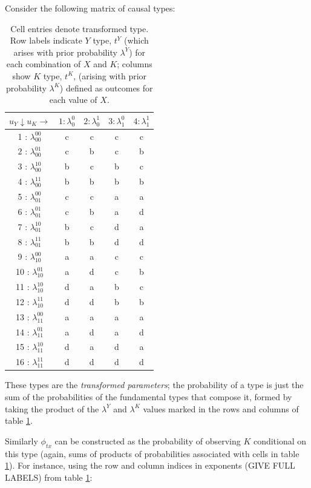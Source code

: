 \documentclass[12pt,]{book}
\begin{document}
Consider the following matrix of causal types:

\begin{table}[ht]
\centering
\begin{tabular}{ccccc}
  \hline
$u_Y \downarrow u_K \rightarrow$ & $1:  \lambda_0^0$ & $2: \lambda_0^1$ & $3: \lambda_1^0$ & $4: \lambda_1^1$ \\ 
  \hline
1 : $\lambda_{00}^{00}$ & c & c & c & c \\ 
  2 : $\lambda_{00}^{01}$ & c & b & c & b \\ 
  3 : $\lambda_{00}^{10}$ & b & c & b & c \\ 
  4 : $\lambda_{00}^{11}$ & b & b & b & b \\ 
  5 : $\lambda_{01}^{00}$ & c & c & a & a \\ 
  6 : $\lambda_{01}^{01}$ & c & b & a & d \\ 
  7 : $\lambda_{01}^{10}$ & b & c & d & a \\ 
  8 : $\lambda_{01}^{11}$ & b & b & d & d \\ 
  9 : $\lambda_{10}^{00}$ & a & a & c & c \\ 
  10 : $\lambda_{10}^{01}$ & a & d & c & b \\ 
  11 : $\lambda_{10}^{10}$ & d & a & b & c \\ 
  12 : $\lambda_{10}^{11}$ & d & d & b & b \\ 
  13 : $\lambda_{11}^{00}$ & a & a & a & a \\ 
  14 : $\lambda_{11}^{01}$ & a & d & a & d \\ 
  15 : $\lambda_{11}^{10}$ & d & a & d & a \\ 
  16 : $\lambda_{11}^{11}$ & d & d & d & d \\ 
   \hline
\end{tabular}
\caption{\label{tab:types} Cell entries denote transformed type. Row labels indicate $Y$ type, $t^Y$ (which arises with prior probability $\lambda^Y$)  for each combination of $X$ and $K$; columns show $K$ type, $t^K$, (arising with prior probability $\lambda^K$)  defined as outcomes for each value of $X$.} 
\end{table}

These types are the \emph{transformed parameters}; the probability of a type is just the sum of the probabilities of the fundamental types that compose it, formed by taking the product of the \(\lambda^Y\) and \(\lambda^K\) values marked in the rows and columns of table \ref{tab:types}.

Similarly \(\phi_{tx}\) can be constructed as the probability of observing \(K\) conditional on this type (again, sums of products of probabilities associated with cells in table \ref{tab:types}). For instance, using the row and column indices in exponents (GIVE FULL LABELS) from table \ref{tab:types}:
\end{document}
